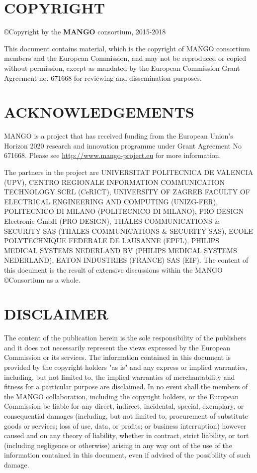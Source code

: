 \section*{COPYRIGHT}

\begin{center}
\copyright Copyright by the \textbf{MANGO} consortium, 2015-2018
\end{center}

This document contains material, which is the copyright of MANGO consortium members and the European Commission, and may not be reproduced or copied without permission, except as mandated by the European Commission Grant Agreement no. 671668 for reviewing and dissemination purposes.

\section*{ACKNOWLEDGEMENTS}

MANGO is a project that has received funding from the European Union's Horizon 2020 research and innovation programme under Grant Agreement No 671668. Please see \url{http://www.mango-project.eu} for more information. 

The partners in the project are UNIVERSITAT POLITECNICA DE VALENCIA (UPV), CENTRO REGIONALE INFORMATION COMMUNICATION TECHNOLOGY SCRL (CeRICT), UNIVERSITY OF ZAGREB FACULTY OF ELECTRICAL ENGINEERING AND COMPUTING (UNIZG-FER), POLITECNICO DI MILANO (POLITECNICO DI MILANO), PRO DESIGN Electronic GmbH (PRO DESIGN), THALES COMMUNICATIONS \& SECURITY SAS (THALES COMMUNICATIONS \& SECURITY SAS), ECOLE POLYTECHNIQUE FEDERALE DE LAUSANNE (EPFL), PHILIPS MEDICAL SYSTEMS NEDERLAND BV (PHILIPS MEDICAL SYSTEMS NEDERLAND), EATON INDUSTRIES (FRANCE) SAS (EIF). The content of this document is the result of extensive discussions within the MANGO \copyright Consortium as a whole.

\section*{DISCLAIMER}

The content of the publication herein is the sole responsibility of the publishers and it does not necessarily represent the views expressed by the European Commission or its services.
The information contained in this document is provided by the copyright holders "as is" and any express or implied warranties, including, but not limited to, the implied warranties of merchantability and fitness for a particular purpose are disclaimed. In no event shall the members of the MANGO collaboration, including the copyright holders, or the European Commission be liable for any direct, indirect, incidental, special, exemplary, or consequential damages (including, but not limited to, procurement of substitute goods or services; loss of use, data, or profits; or business interruption) however caused and on any theory of liability, whether in contract, strict liability, or tort (including negligence or otherwise) arising in any way out of the use of the information contained in this document, even if advised of the possibility of such damage.
